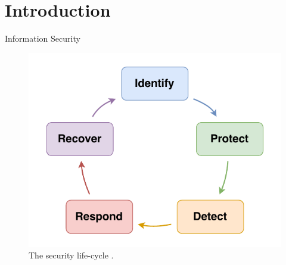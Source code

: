 \section*{Introduction}

\begin{frame}{Information Security}
  \begin{figure}
    \includegraphics[width=.4\linewidth]{figures/intro/security.drawio.pdf}
    \caption*{The security life-cycle \cite{nationalinstituteofstandardsandtechnology_NISTCybersecurityFramework_2024}.}
  \end{figure}

\end{frame}


